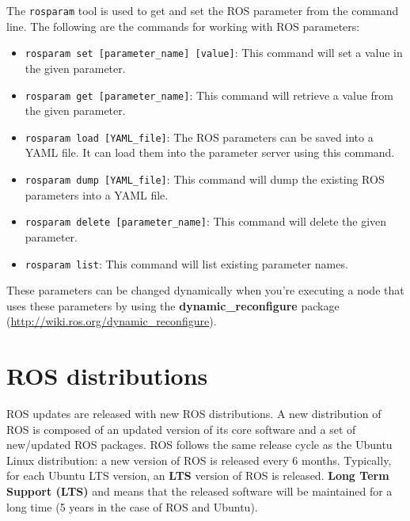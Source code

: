 \documentclass[../../main]{subfiles}
\begin{document}
The \texttt{rosparam} tool is used to get and set the ROS parameter from the command line. The following are the commands for working with ROS parameters:
\begin{itemize}
    \item \texttt{rosparam set [parameter\_name] [value]}: This command will set a value in the given parameter.
    \item \texttt{rosparam get [parameter\_name]}: This command will retrieve a value from the given parameter.
    \item \texttt{rosparam load [YAML\_file]}: The ROS parameters can be saved into a YAML file. It can load them into the parameter server using this command.
    \item \texttt{rosparam dump [YAML\_file]}: This command will dump the existing ROS parameters into a YAML file.
    \item \texttt{rosparam delete [parameter\_name]}: This command will delete the given parameter.
    \item \texttt{rosparam list}: This command will list existing parameter names.
\end{itemize}
These parameters can be changed dynamically when you're executing a node that uses these parameters by using the \textbf{dynamic\_reconfigure} package (\url{http://wiki.ros.org/dynamic_reconfigure}).

\newpage
\section{ROS distributions}
ROS updates are released with new ROS distributions. A new distribution of ROS is composed of an updated version of its core software and a set of new/updated ROS packages. ROS follows the same release cycle as the Ubuntu Linux distribution: a new version of ROS is released every 6 months. Typically, for each Ubuntu LTS version, an \textbf{LTS} version of ROS is released. \textbf{Long Term Support (LTS)} and means that the released software will be maintained for a long time (5 years in the case of ROS and Ubuntu).
\end{document}
